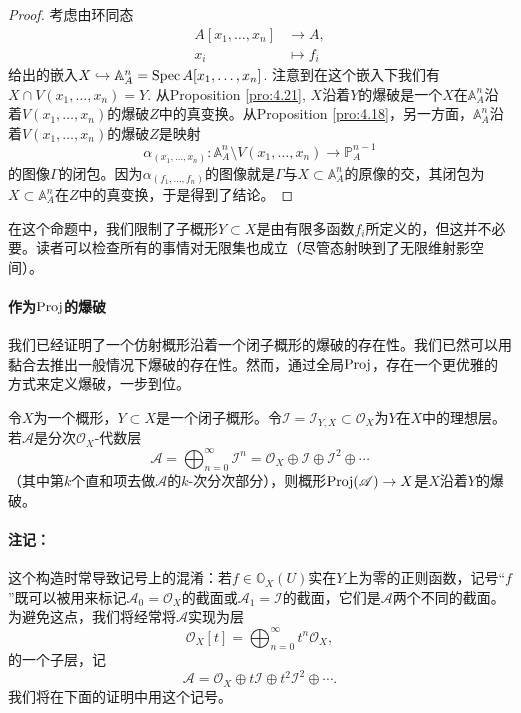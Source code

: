 \begin{proof}
	考虑由环同态
	\[
		\begin{aligned}
			A\left[x_1,\dots,x_n\right] & \longrightarrow A,\\
			x_i &\longmapsto f_i
		\end{aligned}
	\]
	给出的嵌入$X\hookrightarrow \mathbb A_A^n=\operatorname{Spec} A[x_1,\dots,x_n]$.
	注意到在这个嵌入下我们有$X\cap V(x_1,\dots,x_n)=Y$. 从Proposition \ref{pro:4.21}, $X$沿着$Y$的爆破是一个$X$在$\mathbb A_A^n$沿着$V(x_1,\dots,x_n)$的爆破$Z$中的真变换。从Proposition \ref{pro:4.18}，另一方面，$\mathbb A_A^n$沿着$V(x_1,\dots,x_n)$的爆破$Z$是映射
	\[
		\alpha_{(x_1,\dots,x_n)}:\mathbb A_A^n\setminus V(x_1,\dots,x_n)\longrightarrow \mathbb P_A^{n-1}
	\]
	的图像$\Gamma$的闭包。因为$\alpha_{(f_1,\dots,f_n)}$的图像就是$\Gamma$与$X\subset \mathbb A_A^n$的原像的交，其闭包为$X\subset \mathbb A_A^n$在$Z$中的真变换，于是得到了结论。
\end{proof}

在这个命题中，我们限制了子概形$Y\subset X$是由有限多函数$f_i$所定义的，但这并不必要。读者可以检查所有的事情对无限集也成立（尽管态射映到了无限维射影空间）。


\paragraph*{作为$\operatorname{Proj}$的爆破} 我们已经证明了一个仿射概形沿着一个闭子概形的爆破的存在性。我们已然可以用黏合去推出一般情况下爆破的存在性。然而，通过全局$\operatorname{Proj}$，存在一个更优雅的方式来定义爆破，一步到位。

\begin{thm}\label{thm:4.23}
	令$X$为一个概形，$Y\subset X$是一个闭子概形。令$\mathscr I=\mathscr I_{Y,X}\subset \mathscr O_X$为$Y$在$X$中的理想层。若$\mathscr A$是分次$\mathscr O_X$-代数层
	\[
	\mathscr A=\bigoplus_{n=0}^\infty \mathscr I^n=\mathscr O_X\oplus \mathscr I\oplus \mathscr I^2\oplus \cdots
	\]
	（其中第$k$个直和项去做$\mathscr A$的$k$-次分次部分），则概形$\operatorname{Proj}(\mathscr A)\to X$是$X$沿着$Y$的爆破。
\end{thm}

\paragraph*{注记：}这个构造时常导致记号上的混淆：若$f\in \mathbb O_X(U)$实在$Y$上为零的正则函数，记号``$f$''既可以被用来标记$\mathscr A_0=\mathscr O_X$的截面或$\mathscr A_1=\mathscr I$的截面，它们是$\mathscr A$两个不同的截面。为避免这点，我们将经常将$\mathscr A$实现为层
\[
	\mathscr O_X[t]=\bigoplus_{n=0}^\infty t^n\mathscr O_X,
\]
的一个子层，记
\[
	\mathscr A=\mathscr O_X\oplus t\mathscr I\oplus t^2\mathscr I^2\oplus \cdots.
\]
我们将在下面的证明中用这个记号。

